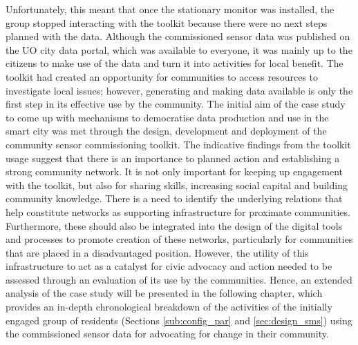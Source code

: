 Unfortunately, this meant that once the stationary monitor was installed, the group stopped interacting with the toolkit because there were no next steps planned with the data. Although the commissioned sensor data was published on the UO city data portal, which was available to everyone, it was mainly up to the citizens to make use of the data and turn it into activities for local benefit. The toolkit had created an opportunity for communities to access resources to investigate local issues; however, generating and making data available is only the first step in its effective use by the community. The initial aim of the case study to come up with mechanisms to democratise data production and use in the smart city was met through the design, development and deployment of the community sensor commissioning toolkit. The indicative findings from the toolkit usage suggest that there is an importance to planned action and establishing a strong community network. It is not only important for keeping up engagement with the toolkit, but also for sharing skills, increasing social capital and building community knowledge. There is a need to identify the underlying relations that help constitute networks as supporting infrastructure for proximate communities. Furthermore, these should also be integrated into the design of the digital tools and processes to promote creation of these networks, particularly for communities that are placed in a disadvantaged position. However, the utility of this infrastructure to act as a catalyst for civic advocacy and action needed to be assessed through an evaluation of its use by the communities. Hence, an extended analysis of the case study will be presented in the following chapter, which provides an in-depth chronological breakdown of the activities of the initially engaged group of residents (Sections \ref{sub:config_par} and \ref{sec:design_sms}) using the commissioned sensor data for advocating for change in their community.
\clearpage

